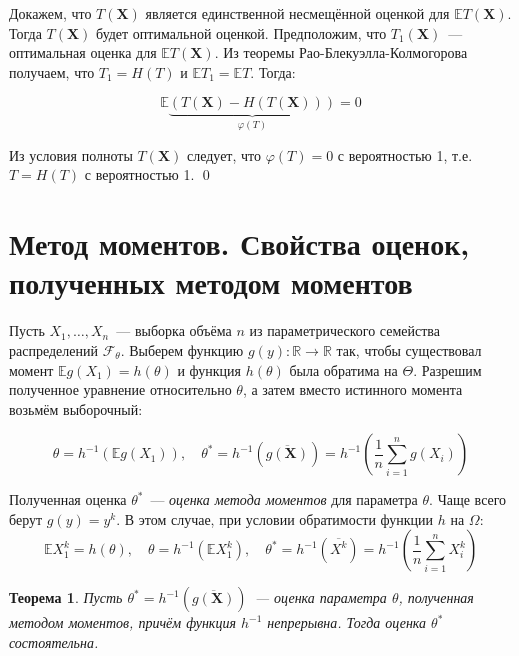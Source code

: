 \documentclass[oneside,final,14pt]{extreport}
\renewenvironment{proof}{{\bfseries Доказательство.}}{\qed}
\newtheorem{thm}{Теорема}[section]
\theoremstyle{definition}
\begin{document}
\begin{proof}
Докажем, что $T(\mathbf{X})$ является единственной несмещённой оценкой для $\mathbb{E}T(\mathbf{X})$. Тогда $T(\mathbf{X})$ будет оптимальной оценкой. Предположим, что $T_1(\mathbf{X})$~--- оптимальная оценка для $\mathbb{E}T(\mathbf{X})$. Из теоремы Рао-Блекуэлла-Колмогорова получаем, что $T_{1}=H(T)$ и $\mathbb{E} T_{1}=\mathbb{E} T$. Тогда:

\begin{equation*}
    \mathbb{E} \underbrace{(T(\mathbf{X})-H(T(\mathbf{X})))}_{\varphi(T)}=0
\end{equation*}

Из условия полноты $T(\mathbf{X})$ следует, что $\varphi(T)=0$ с вероятностью 1, т.е. $T=H(T)$ с вероятностью 1.
\end{proof}

\section{Метод моментов. Свойства оценок, полученных методом моментов}

Пусть $X_1, \ldots, X_n$~--- выборка объёма $n$ из параметрического семейства распределений $\mathcal{F}_\theta$. Выберем функцию $g(y): \mathbb{R} \rightarrow \mathbb{R}$ так, чтобы существовал момент $\mathbb{E} g\left(X_{1}\right)=h(\theta)$ и функция $h(\theta)$ была обратима на $\Theta$. Разрешим полученное уравнение относительно $\theta$, а затем вместо истинного момента возьмём выборочный:

\begin{equation*}
    \theta=h^{-1}\left(\mathbb{E} g\left(X_{1}\right)\right), \quad \theta^{*}=h^{-1}(\overline{g(\mathbf{X})})=h^{-1}\left(\frac{1}{n} \sum_{i=1}^{n} g\left(X_{i}\right)\right)
\end{equation*}

Полученная оценка $\theta^{*}$~--- {\it оценка метода моментов} для параметра $\theta$. Чаще всего берут $g(y)=y^{k}$. В этом случае, при условии обратимости функции $h$ на $\Omega$:
\begin{equation*}
    \mathbb{E} X_{1}^{k}=h(\theta), \quad \theta=h^{-1}\left(\mathbb{E} X_{1}^{k}\right), \quad \theta^{*}=h^{-1}(\overline{X^{k}})=h^{-1}\left(\frac{1}{n} \sum_{i=1}^{n} X_{i}^{k}\right)
\end{equation*}

\begin{thm}
Пусть $\theta^{*}=h^{-1}(\overline{g(\mathbf{X})})$~--- оценка параметра $\theta$, полученная методом моментов, причём функция $h^{-1}$ непрерывна. Тогда оценка $\theta^{*}$ состоятельна.
\end{thm}
\end{document}
